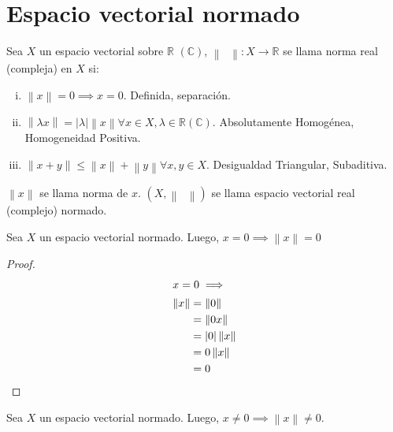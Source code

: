 \section{Espacio vectorial normado}

\begin{definition*}
    Sea $X$ un espacio vectorial sobre $\mathbb{R}$ $\left(\mathbb{C}\right)$, $\left\|\phantom{\cdot}\right\|\colon X\to\mathbb{R}$ se llama norma real (compleja) en $X$ si:
    \begin{enumerate}[i)]
        \item

              \begin{math}
                  \left\|x\right\|=
                  0\implies
                  x=0
              \end{math}.
              Definida, separación.

        \item

              \begin{math}
                  \left\|\lambda x\right\|=
                  \left|\lambda\right|
                  \left\|x\right\|
                  \forall x\in X, \lambda\in\mathbb{R} \left(\mathbb{C}\right)
              \end{math}.
              Absolutamente Homogénea,
              Homogeneidad Positiva.

        \item

              \begin{math}
                  \left\|x+y\right\|\leq
                  \left\|x\right\|+
                  \left\|y\right\|
                  \forall x, y\in X
              \end{math}.
              Desigualdad Triangular, Subaditiva.
    \end{enumerate}
    $\left\|x\right\|$ se llama norma de $x$.
    $\left(X, \left\|\phantom{\cdot}\right\|\right)$ se llama espacio vectorial real (complejo) normado.
\end{definition*}

\begin{proposition*}
    Sea $X$ un espacio vectorial normado.
    Luego,
    \begin{math}
        x=0\implies
        \left\|x\right\|=0
    \end{math}
\end{proposition*}

\begin{proof}
    \begin{align*}
        \shortintertext{$x=0\implies$}
        \left\|x\right\| & =\left\|0\right\|                \\
                         & =\left\|0x\right\|               \\
                         & = \left|0\right|\left\|x\right\| \\
                         & = 0\left\|x\right\|              \\
                         & =0
    \end{align*}
\end{proof}

\begin{proposition*}
    Sea $X$ un espacio vectorial normado.
    Luego, $x\neq0\implies\left\|x\right\|\neq0$.
\end{proposition*}